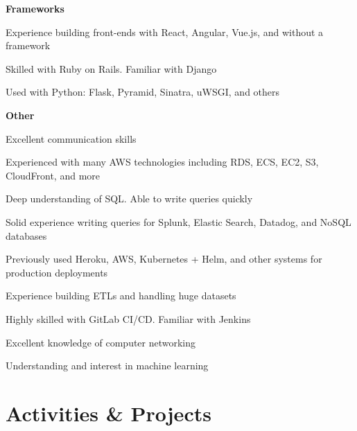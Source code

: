 \documentclass[margin,line]{resume}
\begin{document}
\begin{resume}
    \hspace{2.4mm}\textbf{Frameworks}\vspace{1mm}
    \begin{list2}
        \item Experience building front-ends with React, Angular, Vue.js, and without a framework
        \item Skilled with Ruby on Rails. Familiar with Django
        \item Used with Python: Flask, Pyramid, Sinatra, uWSGI, and others
    \end{list2}\vspace{-1.5mm}

    \hspace{2.4mm}\textbf{Other}\vspace{1mm}
    \begin{list2}
        \item Excellent communication skills
        \item Experienced with many AWS technologies including RDS, ECS, EC2, S3, CloudFront, and more
        \item Deep understanding of SQL. Able to write queries quickly
        \item Solid experience writing queries for Splunk, Elastic Search, Datadog, and NoSQL databases
        \item Previously used Heroku, AWS, Kubernetes + Helm, and other systems for production deployments
        \item Experience building ETLs and handling huge datasets
        \item Highly skilled with GitLab CI/CD. Familiar with Jenkins
        \item Excellent knowledge of computer networking
        \item Understanding and interest in machine learning
    \end{list2}\vspace{-1.5mm}

\sectionline

    \section{\mysidestyle \textbf{\large{A}\small{ctivities \& Projects}}}


\end{resume}
\end{document}
